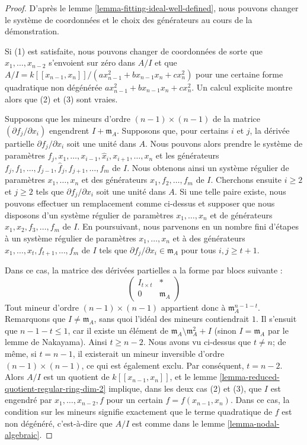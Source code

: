 \begin{proof}
D'après le lemme \ref{lemma-fitting-ideal-well-defined}, nous pouvons changer le système de coordonnées et le choix des générateurs au cours de la démonstration.

\medskip\noindent
Si (1) est satisfaite, nous pouvons changer de coordonnées de sorte que $x_1, \ldots, x_{n - 2}$ s'envoient sur zéro dans $A/I$ et que $A/I = k[[x_{n - 1}, x_n]]/(a x_{n - 1}^2 + b x_{n - 1}x_n + c x_n^2)$ pour une certaine forme quadratique non dégénérée $a x_{n - 1}^2 + b x_{n - 1}x_n + c x_n^2$. Un calcul explicite montre alors que (2) et (3) sont vraies.

\medskip\noindent
Supposons que les mineurs d'ordre $(n - 1) \times (n - 1)$ de la matrice $(\partial f_j/\partial x_i)$ engendrent $I + \mathfrak m_A$. Supposons que, pour certains $i$ et $j$, la dérivée partielle $\partial f_j/\partial x_i$ soit une unité dans $A$. Nous pouvons alors prendre le système de paramètres $f_j, x_1, \ldots, x_{i - 1}, \hat x_i, x_{i + 1}, \ldots, x_n$ et les générateurs $f_j, f_1, \ldots, f_{j - 1}, \hat f_j, f_{j + 1}, \ldots, f_m$ de $I$. Nous obtenons ainsi un système régulier de paramètres $x_1, \ldots, x_n$ et des générateurs $x_1, f_2, \ldots, f_m$ de $I$. Cherchons ensuite $i \geq 2$ et $j \geq 2$ tels que $\partial f_j/\partial x_i$ soit une unité dans $A$. Si une telle paire existe, nous pouvons effectuer un remplacement comme ci-dessus et supposer que nous disposons d'un système régulier de paramètres $x_1, \ldots, x_n$ et de générateurs $x_1, x_2, f_3, \ldots, f_m$ de $I$. En poursuivant, nous parvenons en un nombre fini d'étapes à un système régulier de paramètres $x_1, \ldots, x_n$ et à des générateurs $x_1, \ldots, x_t, f_{t + 1}, \ldots, f_m$ de $I$ tels que $\partial f_j/\partial x_i \in \mathfrak m_A$ pour tous $i, j \geq t + 1$.

\medskip\noindent
Dans ce cas, la matrice des dérivées partielles a la forme par blocs suivante : $$
\left(
\begin{matrix}
I_{t \times t} & * \\
0 & \mathfrak m_A
\end{matrix}
\right)
$$ Tout mineur d'ordre $(n - 1) \times (n - 1)$ appartient donc à $\mathfrak m_A^{n - 1 - t}$. Remarquons que $I \not = \mathfrak m_A$, sans quoi l'idéal des mineurs contiendrait $1$. Il s'ensuit que $n - 1 - t \leq 1$, car il existe un élément de $\mathfrak m_A \setminus \mathfrak m_A^2 + I$ (sinon $I = \mathfrak m_A$ par le lemme de Nakayama). Ainsi $t \geq n - 2$. Nous avons vu ci-dessus que $t \not = n$; de même, si $t = n - 1$, il existerait un mineur inversible d'ordre $(n - 1) \times (n - 1)$, ce qui est également exclu. Par conséquent, $t = n - 2$. Alors $A/I$ est un quotient de $k[[x_{n - 1}, x_n]]$, et le lemme \ref{lemma-reduced-quotient-regular-ring-dim-2} implique, dans les deux cas (2) et (3), que $I$ est engendré par $x_1, \ldots, x_{n - 2}, f$ pour un certain $f = f(x_{n - 1}, x_n)$. Dans ce cas, la condition sur les mineurs signifie exactement que le terme quadratique de $f$ est non dégénéré, c'est-à-dire que $A/I$ est comme dans le lemme \ref{lemma-nodal-algebraic}.
\end{proof}

